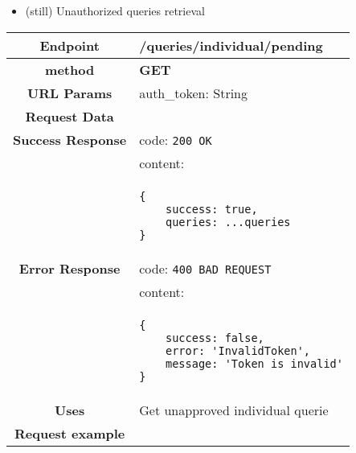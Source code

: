     
        \begin{itemize}
        \item (still) Unauthorized queries retrieval
    \end{itemize}
    \begin{adjustwidth}{1cm}{}
        \begin{longtable}{|c|l|}
            \hline
            \textbf{Endpoint} & /queries/individual/pending \\
            \hline
            \textbf{method} & \textbf{GET} \\
            \hline
            \textbf{URL Params} &  auth\_token: String \\
            \hline
            \textbf{Request Data} & \\
            \hline
            \textbf{Success Response} & code: \texttt{200 OK} \\
            &                           content: \\
            & \begin{minipage}[t]{0.5\textwidth}
                \begin{adjustwidth}{1.5cm}{}
                \begin{verbatim}
{
    success: true, 
    queries: ...queries
}
                \end{verbatim}
                \end{adjustwidth}
              \end{minipage} \\
              \hline
            \textbf{Error Response} & code: \texttt{400 BAD REQUEST} \\
              &                     content: \\
              & \begin{minipage}[t]{0.7\textwidth}
                \begin{adjustwidth}{1.5cm}{}
                \begin{verbatim}
{
    success: false, 
    error: 'InvalidToken',
    message: 'Token is invalid'
}
                \end{verbatim}
                \end{adjustwidth}
                 \vspace{4pt}
              \end{minipage} \\
              \hline
            \textbf{Uses} & Get unapproved individual querie \\
            \hline
                           \textbf{Request example}

\end{longtable}
\end{adjustwidth}
